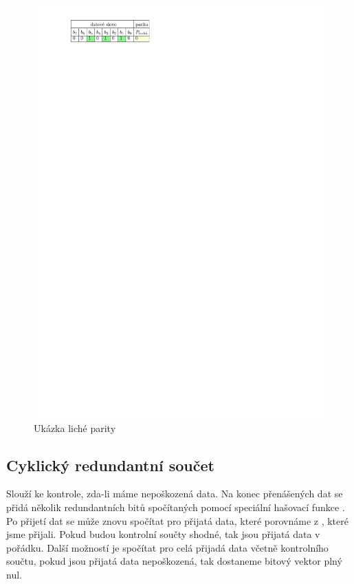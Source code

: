 \begin{figure}[H]
    \begin{center}
        \includegraphics[scale=1]{img/parita_licha}
    \end{center}
    \caption{Ukázka liché parity}
\end{figure}

\subsection{Cyklický redundantní součet}
Slouží ke kontrole, zda-li máme nepoškozená data. Na konec přenášených dat se přidá několik redundantních bitů spočítaných pomocí speciální hašovací funkce . Po přijetí dat se může znovu spočítat  pro přijatá data, které porovnáme z , které jsme přijali. Pokud budou kontrolní součty shodné, tak jsou přijatá data v pořádku. Další možností je spočítat  pro celá přijadá data včetně kontrolního součtu, pokud jsou přijatá data nepoškozená,  tak dostaneme bitový vektor plný nul.

